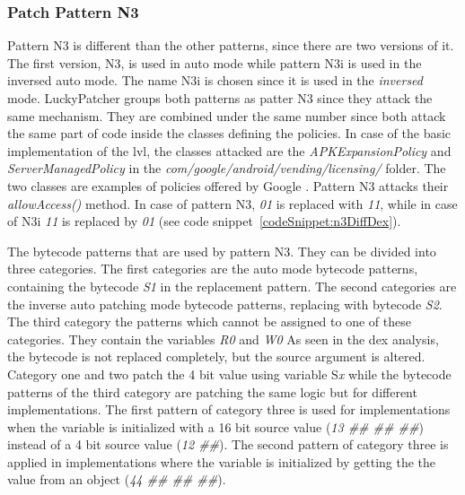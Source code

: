 \subsubsection{Patch Pattern N3}
Pattern N3 is different than the other patterns, since there are two versions of it.
The first version, N3, is used in auto mode while pattern N3i is used in the inversed auto mode.
The name N3i is chosen since it is used in the \textit{inversed} mode.
LuckyPatcher groups both patterns as patter N3 since they attack the same mechanism.
They are combined under the same number since both attack the same part of code inside the classes defining the policies.
In case of the basic implementation of the \gls{lvl}, the classes attacked are the \textit{APKExpansionPolicy} and \textit{ServerManagedPolicy} in the  \textit{com/google/android/vending/licensing/} folder.
The two classes are examples of policies offered by Google \cite{developersLicensingReference}.
Pattern N3 attacks their \textit{allowAccess()} method.
\newline
In case of pattern N3, \textit{01} is replaced with \textit{11}, while in case of N3i \textit{11} is replaced by \textit{01} (see code snippet~\ref{codeSnippet:n3DiffDex}).
\newline

The bytecode patterns that are used by pattern N3.
They can be divided into three categories.
The first categories are the auto mode bytecode patterns, containing the bytecode \textit{S1} in the replacement pattern.
The second categories are the inverse auto patching mode bytecode patterns, replacing with bytecode \textit{S2}.
The third category the patterns which cannot be assigned to one of these categories.
They contain the variables \textit{R0} and \textit{W0}
\newline
As seen in the dex analysis, the bytecode is not replaced completely, but the source argument is altered.
Category one and two patch the 4 bit value using variable S\textit{x} while the bytecode patterns of the third category are patching the same logic but for different implementations.
The first pattern of category three is used for implementations when the variable is initialized  with a 16 bit source value (\textit{13 \#\# \#\# \#\#}) instead of a 4 bit source value (\textit{12 \#\#}).
The second pattern of category three is applied in implementations where the variable is initialized by getting the the value from an object (\textit{44 \#\# \#\# \#\#}).
